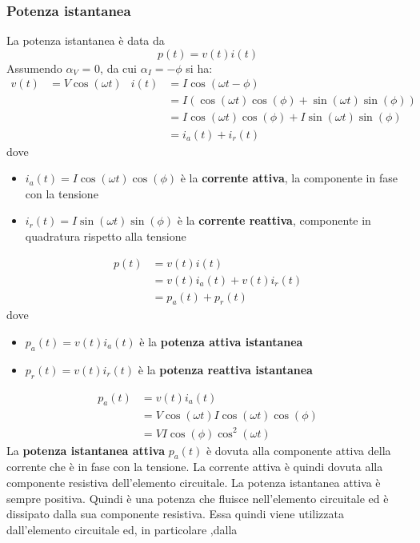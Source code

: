 \documentclass{article}
\begin{document}
\subsubsection{Potenza istantanea}
La potenza istantanea è data da 
\[
    p(t) = v(t)i(t)    
\]
Assumendo $\alpha_V$ = 0, da cui $\alpha_I=- \phi$ si ha:
\begin{align*}
    v(t) &= V \cos(\omega t) & 
    i(t) &= I \cos(\omega t - \phi)
    \\
    & &
    &=I (\cos(\omega t)\cos(\phi) + \sin(\omega t)\sin(\phi))
    \\
    & &
    &= I\cos(\omega t)\cos(\phi) + I\sin(\omega t)
    \sin(\phi)
    \\
    & &
    &= i_a(t) + i_r(t)
\end{align*}
dove 
\begin{itemize}
    \item $i_a(t)= I\cos(\omega t)\cos(\phi)$ è la \textbf{corrente attiva}, la componente in fase con la tensione
    \item $i_r(t)=I\sin(\omega t) \sin(\phi)$ è la \textbf{corrente reattiva}, componente in quadratura rispetto alla tensione
\end{itemize}
\begin{align*}
    p(t) &= v(t)i(t)
    \\
    &=v(t)i_a(t) + v(t)i_r(t)
    \\
    &=p_a(t) + p_r(t)
\end{align*}
dove
\begin{itemize}
    \item $p_a(t)= v(t)i_a(t)$ è la \textbf{potenza attiva istantanea}
    \item $p_r(t)= v(t)i_r(t)$ è la \textbf{potenza reattiva istantanea}
\end{itemize}
\begin{align*}
    p_a(t) &= v(t)i_a(t)
    \\
    &=V \cos(\omega t)I \cos(\omega t)\cos(\phi)
    \\
    &= VI\cos(\phi)\cos^2(\omega t)
\end{align*}
La \textbf{potenza istantanea attiva} $p_a(t)$ è dovuta
alla componente attiva della corrente che è in
fase con la tensione. La corrente attiva è
quindi dovuta alla componente resistiva
dell'elemento circuitale. La potenza
istantanea attiva è sempre positiva. Quindi è
una potenza che fluisce nell'elemento
circuitale ed è dissipato dalla sua componente
resistiva. Essa quindi viene utilizzata
dall'elemento circuitale ed, in particolare ,dalla
\end{document}
